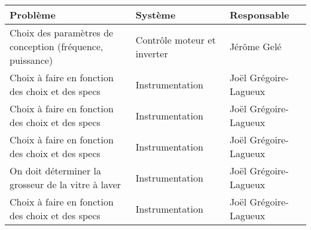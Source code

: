 \begin{tabularx}{\linewidth}{
    |>{\hsize=2.0\hsize}X|%
    >{\hsize=0.5\hsize}X|%
    >{\hsize=0.5\hsize}X|%
  }
    \hline
    \textbf{Problème} & \textbf{Système} & \textbf{Responsable} \\\hline
    Choix des paramètres de conception (fréquence, puissance) & Contrôle moteur et inverter & Jérôme Gelé \\\hline
    Choix à faire en fonction des choix et des specs & Instrumentation & Joël Grégoire-Lagueux \\\hline
    Choix à faire en fonction des choix et des specs & Instrumentation & Joël Grégoire-Lagueux \\\hline
    Choix à faire en fonction des choix et des specs & Instrumentation & Joël Grégoire-Lagueux \\\hline
    On doit déterminer la grosseur de la vitre à laver & Instrumentation & Joël Grégoire-Lagueux \\\hline
    Choix à faire en fonction des choix et des specs & Instrumentation & Joël Grégoire-Lagueux \\\hline
  \end{tabularx}
     